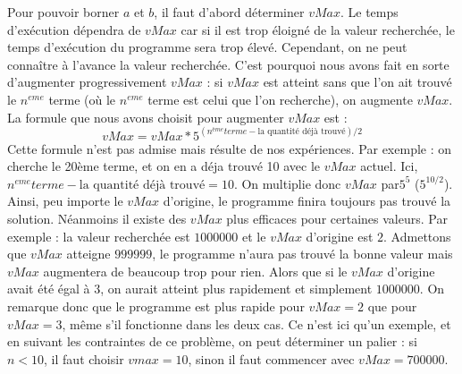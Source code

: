 \documentclass{article}
\begin{document}
Pour pouvoir borner $a$ et $b$, il faut d'abord déterminer $vMax$. Le temps d'exécution dépendra de $vMax$ car si il est trop éloigné de la valeur recherchée, le temps d'exécution du programme sera trop élevé. Cependant, on ne peut connaître à l'avance la valeur recherchée. C'est pourquoi nous avons fait en sorte d'augmenter progressivement $vMax$ : si $vMax$ est atteint sans que l'on ait trouvé le $n^{eme}$ terme (où le $n^{eme}$ terme est celui que l'on recherche), on augmente $vMax$. La formule que nous avons choisit pour augmenter $vMax$ est : \[vMax = vMax * 5^{(n^{ème} terme - \text{la quantité déjà trouvé})/2}\] Cette formule n'est pas admise mais résulte de nos expériences. Par exemple : on cherche le 20ème terme, et on en a déja trouvé 10 avec le $vMax$ actuel. Ici, $n^{eme} terme - \text{la quantité déjà trouvé} = 10$. On multiplie donc $vMax$ par$5^{5}$ ($5^{10/2}$). Ainsi, peu importe le $vMax$ d'origine, le programme finira toujours pas trouvé la solution. Néanmoins il existe des $vMax$ plus efficaces pour certaines valeurs. Par exemple : la valeur recherchée est $1 000 000$ et le $vMax$ d'origine est $2$. Admettons que $vMax$ atteigne $999 999$, le programme n'aura pas trouvé la bonne valeur mais $vMax$ augmentera de beaucoup trop pour rien. Alors que si le $vMax$ d'origine avait été égal à $3$, on aurait atteint plus rapidement et simplement $1 000 000$. On remarque donc que le programme est plus rapide pour $vMax = 2$ que pour $vMax = 3$, même s'il fonctionne dans les deux cas. Ce n'est ici qu'un exemple, et en suivant les contraintes de ce problème, on peut déterminer un palier : si $n < 10$, il faut choisir $vmax = 10$, sinon il faut commencer avec $vMax = 700 000$.
\end{document}

